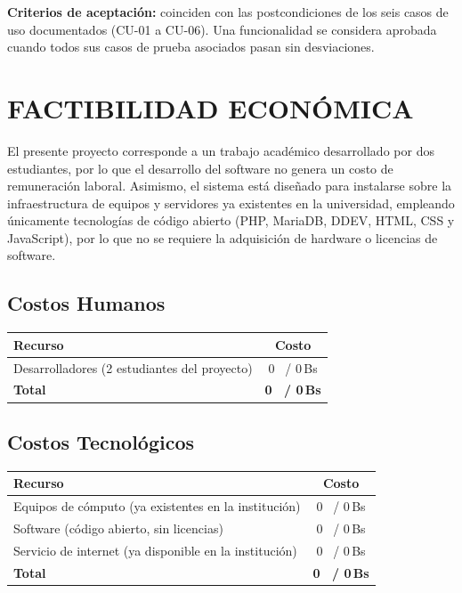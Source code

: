 \documentclass[12pt, letterpaper, oneside]{report}
\begin{document}
\textbf{Criterios de aceptaci\'on:} coinciden con las postcondiciones de los seis casos de uso documentados (CU-01 a CU-06). Una funcionalidad se considera aprobada cuando todos sus casos de prueba asociados pasan sin desviaciones.

\newpage

\chapter{FACTIBILIDAD ECON\'OMICA}

El presente proyecto corresponde a un trabajo acad\'emico desarrollado por dos estudiantes, por lo que el desarrollo del software no genera un costo de remuneraci\'on laboral. Asimismo, el sistema est\'a dise\~nado para instalarse sobre la infraestructura de equipos y servidores ya existentes en la universidad, empleando \'unicamente tecnolog\'ias de c\'odigo abierto (PHP, MariaDB, DDEV, HTML, CSS y JavaScript), por lo que no se requiere la adquisici\'on de hardware o licencias de software.

\section{Costos Humanos}

\begin{center}
\begin{tabularx}{\textwidth}{|X|c|}
\hline
\textbf{Recurso} & \textbf{Costo} \\
\hline
Desarrolladores (2 estudiantes del proyecto) & 0\ \textdollar{} / 0\,Bs \\
\hline
\textbf{Total} & \textbf{0\ \textdollar{} / 0\,Bs} \\
\hline
\end{tabularx}
\end{center}

\section{Costos Tecnol\'ogicos}

\begin{center}
\begin{tabularx}{\textwidth}{|X|c|}
\hline
\textbf{Recurso} & \textbf{Costo} \\
\hline
Equipos de c\'omputo (ya existentes en la instituci\'on) & 0\ \textdollar{} / 0\,Bs \\
\hline
Software (c\'odigo abierto, sin licencias) & 0\ \textdollar{} / 0\,Bs \\
\hline
Servicio de internet (ya disponible en la instituci\'on) & 0\ \textdollar{} / 0\,Bs \\
\hline
\textbf{Total} & \textbf{0\ \textdollar{} / 0\,Bs} \\
\hline
\end{tabularx}
\end{center}
\end{document}
